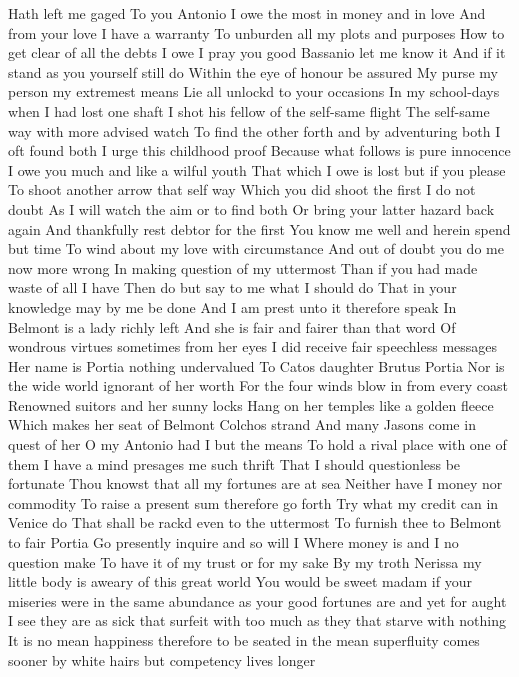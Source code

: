 Hath left me gaged To you Antonio
I owe the most in money and in love
And from your love I have a warranty
To unburden all my plots and purposes
How to get clear of all the debts I owe
I pray you good Bassanio let me know it
And if it stand as you yourself still do
Within the eye of honour be assured
My purse my person my extremest means
Lie all unlockd to your occasions
In my school-days when I had lost one shaft
I shot his fellow of the self-same flight
The self-same way with more advised watch
To find the other forth and by adventuring both
I oft found both I urge this childhood proof
Because what follows is pure innocence
I owe you much and like a wilful youth
That which I owe is lost but if you please
To shoot another arrow that self way
Which you did shoot the first I do not doubt
As I will watch the aim or to find both
Or bring your latter hazard back again
And thankfully rest debtor for the first
You know me well and herein spend but time
To wind about my love with circumstance
And out of doubt you do me now more wrong
In making question of my uttermost
Than if you had made waste of all I have
Then do but say to me what I should do
That in your knowledge may by me be done
And I am prest unto it therefore speak
In Belmont is a lady richly left
And she is fair and fairer than that word
Of wondrous virtues sometimes from her eyes
I did receive fair speechless messages
Her name is Portia nothing undervalued
To Catos daughter Brutus Portia
Nor is the wide world ignorant of her worth
For the four winds blow in from every coast
Renowned suitors and her sunny locks
Hang on her temples like a golden fleece
Which makes her seat of Belmont Colchos strand
And many Jasons come in quest of her
O my Antonio had I but the means
To hold a rival place with one of them
I have a mind presages me such thrift
That I should questionless be fortunate
Thou knowst that all my fortunes are at sea
Neither have I money nor commodity
To raise a present sum therefore go forth
Try what my credit can in Venice do
That shall be rackd even to the uttermost
To furnish thee to Belmont to fair Portia
Go presently inquire and so will I
Where money is and I no question make
To have it of my trust or for my sake
By my troth Nerissa my little body is aweary of
this great world
You would be sweet madam if your miseries were in
the same abundance as your good fortunes are and
yet for aught I see they are as sick that surfeit
with too much as they that starve with nothing It
is no mean happiness therefore to be seated in the
mean superfluity comes sooner by white hairs but
competency lives longer
